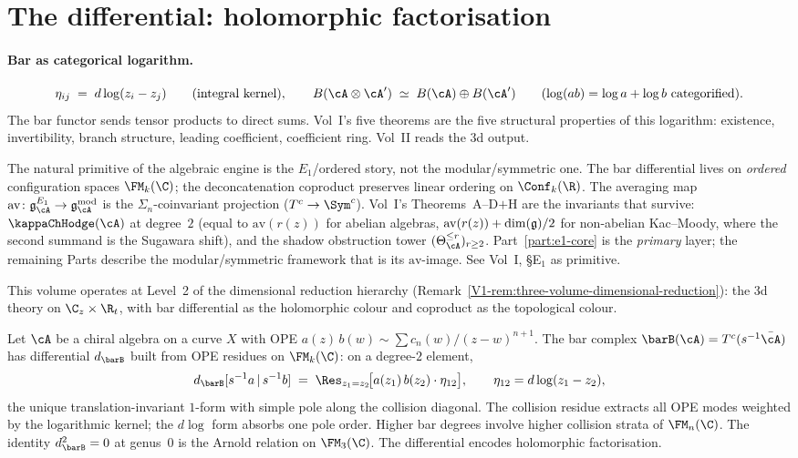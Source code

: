 \section*{The differential: holomorphic factorisation}

\paragraph{Bar as categorical logarithm.}
\[
 \eta_{ij} \;=\; d\log(z_i - z_j)
 \qquad\text{(integral kernel)},
 \qquad
 B(\cA \otimes \cA') \;\simeq\; B(\cA) \oplus B(\cA')
 \qquad\text{($\log(ab) = \log a + \log b$ categorified)}.
\]
The bar functor sends tensor products to direct sums. Vol~I's
five theorems are the five structural properties of this
logarithm: existence, invertibility, branch structure, leading
coefficient, coefficient ring. Vol~II reads the 3d output.

\begin{remark}[$E_1$ primacy]
\label{rem:vol2-e1-primacy}
The natural primitive of the algebraic engine is the
$E_1$/ordered story, not the modular/symmetric one. The bar
differential lives on \emph{ordered} configuration spaces
$\FM_k(\C)$; the deconcatenation coproduct preserves linear
ordering on $\Conf_k(\R)$. The averaging map
$\mathrm{av}\colon \mathfrak{g}^{E_1}_\cA \to
\mathfrak{g}^{\mathrm{mod}}_\cA$ is the
$\Sigma_n$-coinvariant projection
($T^c \to \Sym^c$). Vol~I's Theorems~A--D$+$H are the invariants
that survive: $\kappaChHodge(\cA)$ at degree~$2$
(equal to $\mathrm{av}(r(z))$ for abelian algebras,
$\mathrm{av}(r(z)) + \dim(\mathfrak{g})/2$ for non-abelian Kac--Moody,
where the second summand is the Sugawara shift), and the shadow
obstruction tower $(\Theta_\cA^{\le r})_{r \ge 2}$.
Part~\ref{part:e1-core} is the \emph{primary} layer; the
remaining Parts describe the modular/symmetric framework that is
its $\mathrm{av}$-image.
See Vol~I, \S\textup{E$_1$ as primitive}.
\end{remark}

\begin{remark}
\label{rem:vol2-dimensional-reduction}
This volume operates at Level~2 of the dimensional reduction
hierarchy (Remark~\ref*{V1-rem:three-volume-dimensional-reduction}):
the 3d theory on $\C_z \times \R_t$, with bar differential as
the holomorphic colour and coproduct as the topological colour.
\end{remark}

Let $\cA$ be a chiral algebra on a curve $X$ with OPE
$a(z)\,b(w) \sim \sum c_n(w)/(z-w)^{n+1}$. The bar complex
$\barB(\cA) = T^c(s^{-1}\bar\cA)$ has differential $d_{\barB}$
built from OPE residues on $\FM_k(\C)$: on a degree-$2$ element,
\[
d_{\barB}[s^{-1}a \,|\, s^{-1}b]
\;=\;
\Res_{z_1 = z_2}\!\bigl[a(z_1)\,b(z_2)\cdot\eta_{12}\bigr],
\qquad
\eta_{12} = d\log(z_1 - z_2),
\]
the unique translation-invariant $1$-form with simple pole along
the collision diagonal. The collision residue extracts all OPE
modes weighted by the logarithmic kernel; the $d\log$ form
absorbs one pole order. Higher bar degrees involve higher
collision strata of $\FM_n(\C)$. The identity $d_{\barB}^2 = 0$
at genus~$0$ is the Arnold relation on $\FM_3(\C)$. The
differential encodes holomorphic factorisation.

